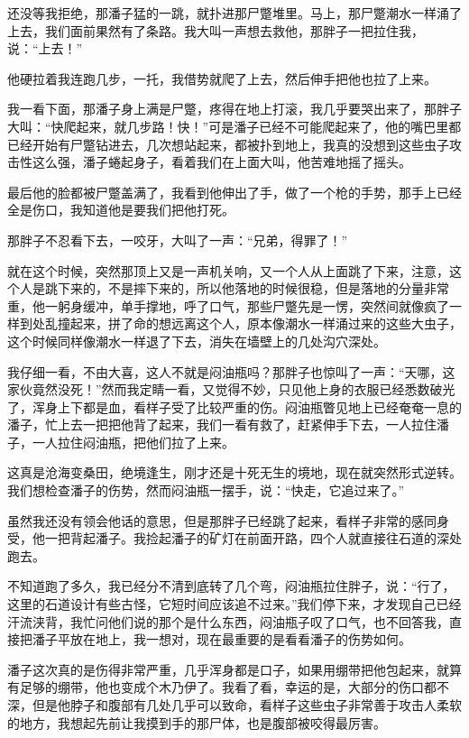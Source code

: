 还没等我拒绝，那潘子猛的一跳，就扑进那尸蹩堆里。马上，那尸蹩潮水一样涌了上去，我们面前果然有了条路。我大叫一声想去救他，那胖子一把拉住我，说：“上去！”

他硬拉着我连跑几步，一托，我借势就爬了上去，然后伸手把他也拉了上来。

我一看下面，那潘子身上满是尸蹩，疼得在地上打滚，我几乎要哭出来了，那胖子大叫：“快爬起来，就几步路！快！”可是潘子已经不可能爬起来了，他的嘴巴里都已经开始有尸蹩钻进去，几次想站起来，都被扑到地上，我真的没想到这些虫子攻击性这么强，潘子蜷起身子，看着我们在上面大叫，他苦难地摇了摇头。

最后他的脸都被尸蹩盖满了，我看到他伸出了手，做了一个枪的手势，那手上已经全是伤口，我知道他是要我们把他打死。

那胖子不忍看下去，一咬牙，大叫了一声：“兄弟，得罪了！”

就在这个时候，突然那顶上又是一声机关响，又一个人从上面跳了下来，注意，这个人是跳下来的，不是摔下来的，所以他落地的时候很稳，但是落地的分量非常重，他一躬身缓冲，单手撑地，呼了口气，那些尸蹩先是一愣，突然间就像疯了一样到处乱撞起来，拼了命的想远离这个人，原本像潮水一样涌过来的这些大虫子，这个时候同样像潮水一样退了下去，消失在墙壁上的几处沟穴深处。

我仔细一看，不由大喜，这人不就是闷油瓶吗？那胖子也惊叫了一声：“天哪，这家伙竟然没死！”然而我定睛一看，又觉得不妙，只见他上身的衣服已经悉数破光了，浑身上下都是血，看样子受了比较严重的伤。闷油瓶瞥见地上已经奄奄一息的潘子，忙上去一把把他背了起来，我们一看有救了，赶紧伸手下去，一人拉住潘子，一人拉住闷油瓶，把他们拉了上来。

这真是沧海变桑田，绝境逢生，刚才还是十死无生的境地，现在就突然形式逆转。我们想检查潘子的伤势，然而闷油瓶一摆手，说：“快走，它追过来了。”

虽然我还没有领会他话的意思，但是那胖子已经跳了起来，看样子非常的感同身受，他一把背起潘子。我捡起潘子的矿灯在前面开路，四个人就直接往石道的深处跑去。

不知道跑了多久，我已经分不清到底转了几个弯，闷油瓶拉住胖子，说：“行了，这里的石道设计有些古怪，它短时间应该追不过来。”我们停下来，才发现自己已经汗流浃背，我忙问他们说的那个是什么东西，闷油瓶子叹了口气，也不回答我，直接把潘子平放在地上，我一想对，现在最重要的是看看潘子的伤势如何。

潘子这次真的是伤得非常严重，几乎浑身都是口子，如果用绷带把他包起来，就算有足够的绷带，他也变成个木乃伊了。我看了看，幸运的是，大部分的伤口都不深，但是他脖子和腹部有几处几乎可以致命，看样子这些虫子非常善于攻击人柔软的地方，我想起先前让我摸到手的那尸体，也是腹部被咬得最厉害。

